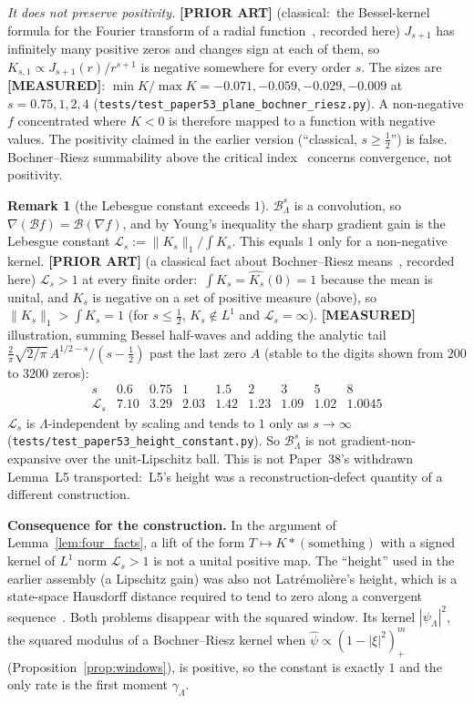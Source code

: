 \documentclass[11pt,a4paper]{article}
\theoremstyle{plain}
\theoremstyle{definition}
\newtheorem{remark}[theorem]{Remark}
\newcommand{\Berez}{\mathcal{B}}
\newcommand{\Lebesgue}{\mathcal{L}}
\providecommand{\normone}[1]{\lVert #1 \rVert_{1}}
\begin{document}
\emph{It does not preserve positivity.} \textbf{[PRIOR ART]}
(classical:\ the Bessel-kernel formula for the Fourier transform of a
radial function~\cite{stein_weiss}, recorded here)
$J_{s+1}$ has infinitely many positive zeros and changes sign at each of
them, so $K_{s,1}\propto J_{s+1}(r)/r^{s+1}$ is negative somewhere for
every order $s$. The sizes are \textbf{[MEASURED]}:
$\min K/\max K=-0.071,-0.059,-0.029,-0.009$ at
$s=0.75,1,2,4$ (\texttt{tests/test\_paper53\_plane\_bochner\_riesz.py}).
A non-negative $f$ concentrated where $K<0$ is therefore mapped to a
function with negative values. The positivity claimed in the earlier
version (``classical, $s\ge\tfrac12$'') is false. Bochner--Riesz summability
above the critical index~\cite{stein_weiss} concerns convergence, not
positivity.

\begin{remark}[the Lebesgue constant exceeds $1$]
\label{rem:height_constant}
$\Berez_{\Lambda}^{s}$ is a convolution, so
$\nabla(\Berez f)=\Berez(\nabla f)$, and by Young's inequality the
sharp gradient gain is the Lebesgue constant
$\Lebesgue_{s}:=\normone{K_{s}}/\int K_{s}$. This equals $1$ only for a
non-negative kernel. \textbf{[PRIOR ART]} (a classical fact about
Bochner--Riesz means~\cite{stein_weiss}, recorded here) $\Lebesgue_{s}>1$ at every
finite order:\ $\int K_{s}=\widehat{K_{s}}(0)=1$ because the mean is unital,
and $K_{s}$ is negative on a set of positive measure (above), so
$\normone{K_{s}}>\int K_{s}=1$ (for $s\le\tfrac12$, $K_{s}\notin L^{1}$ and
$\Lebesgue_{s}=\infty$). \textbf{[MEASURED]} illustration, summing
Bessel half-waves and adding the analytic tail
$\tfrac{2}{\pi}\sqrt{2/\pi}\,A^{1/2-s}/(s-\tfrac12)$ past the last zero $A$
(stable to the digits shown from $200$ to $3200$ zeros):
\[
\begin{array}{l|cccccccc}
s & 0.6 & 0.75 & 1 & 1.5 & 2 & 3 & 5 & 8\\\hline
\Lebesgue_{s} & 7.10 & 3.29 & 2.03 & 1.42 & 1.23 & 1.09 & 1.02 & 1.0045
\end{array}
\]
$\Lebesgue_{s}$ is $\Lambda$-independent by scaling and tends to $1$
only as $s\to\infty$ (\texttt{tests/test\_paper53\_height\_constant.py}).
So $\Berez_{\Lambda}^{s}$ is not gradient-non-expansive over the
unit-Lipschitz ball. This is not Paper~38's
withdrawn Lemma~L5 transported:\ L5's height was a reconstruction-defect
quantity of a different construction.

\textbf{Consequence for the construction.} In the argument of
Lemma~\ref{lem:four_facts}, a lift of the form
$T\mapsto K*(\text{something})$ with a signed kernel of $L^{1}$ norm
$\Lebesgue_{s}>1$ is not a unital positive map. The ``height'' used
in the earlier assembly (a Lipschitz gain) was also not Latr\'emoli\`ere's
height, which is a state-space Hausdorff distance required to
tend to zero along a convergent sequence~\cite{latremoliere_metric_st,
latremoliere2025}. Both problems disappear with the squared window. Its
kernel $|\psi_{\Lambda}|^{2}$, the squared modulus of a Bochner--Riesz
kernel when $\widehat\psi\propto(1-|\xi|^{2})^{m}_{+}$
(Proposition~\ref{prop:windows}), is positive, so the constant is exactly
$1$ and the only rate is the first moment $\gamma_{\Lambda}$.
\end{remark}
\end{document}
